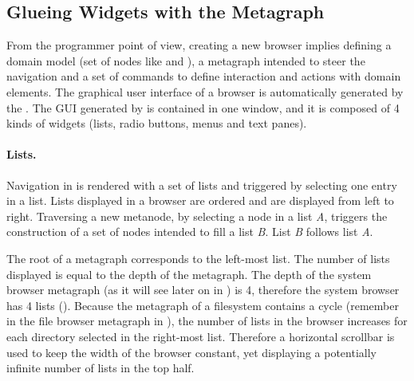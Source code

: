 \documentclass[a4paper,10pt,twoside]{book}
\begin{document}
\subsection{Glueing Widgets with the Metagraph}\label{widgets}
From the programmer point of view, creating a new browser implies defining a domain model (set of nodes like  and ), a metagraph intended to steer the navigation and a set of commands to define interaction and actions with domain elements. The graphical user interface of a browser is automatically generated by the \obf. The GUI generated by \obf is contained in one window, and it is composed of 4 kinds of widgets (lists, radio buttons, menus and text panes).



\paragraph{Lists.} Navigation in \obf is rendered with a set of lists and triggered by selecting one entry in a list. Lists displayed in a browser are ordered and are displayed from left to right. Traversing a new metanode, by selecting a node in a list \textit{A}, triggers the construction of a set of nodes intended to fill a list \textit{B}. List \textit{B} follows list \textit{A}.

The root of a metagraph corresponds to the left-most list. The number of lists displayed is equal to the depth of the metagraph. The depth of the system browser metagraph (as it will see later on in ) is 4, therefore the system browser has 4 lists (). Because the metagraph of a filesystem contains a cycle (remember  in the file browser metagraph in ), the number of lists in the browser increases for each directory selected in the right-most list. Therefore a horizontal scrollbar is used to keep the width of the browser constant, yet displaying a potentially infinite number of lists in the top half.
\end{document}
